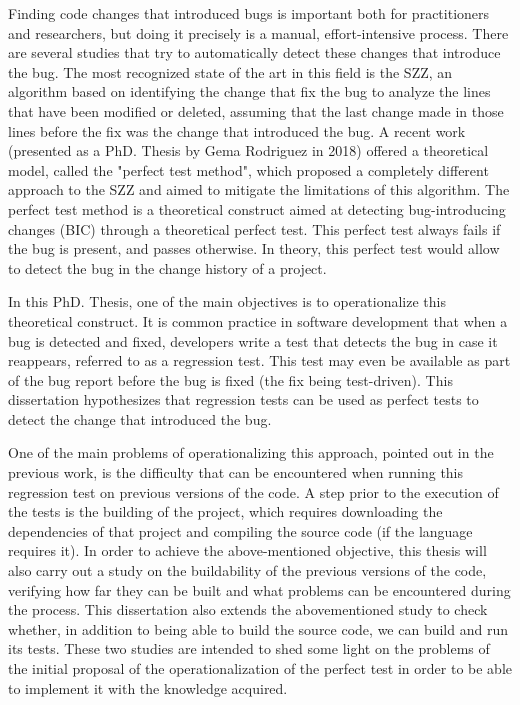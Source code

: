 Finding code changes that introduced bugs is important both for practitioners and researchers, but doing it precisely is a manual, effort-intensive process.
There are several studies that try to automatically detect these changes that introduce the bug. 
The most recognized state of the art in this field is the SZZ, an algorithm based on identifying the change that fix the bug to analyze the lines that have been modified or deleted, assuming that the last change made in those lines before the fix was the change that introduced the bug. 
A recent work (presented as a PhD. Thesis by Gema Rodriguez in 2018) offered a theoretical model, called the "perfect test method", which proposed a completely different approach to the SZZ and aimed to mitigate the limitations of this algorithm. 
The perfect test method is a theoretical construct aimed at detecting bug-introducing changes (BIC) through a theoretical perfect test. This perfect test always fails if the bug is present, and passes otherwise.
In theory, this perfect test would allow to detect the bug in the change history of a project.

In this PhD. Thesis, one of the main objectives is to operationalize this theoretical construct.
It is common practice in software development that when a bug is detected and fixed, developers write a test that detects the bug in case it reappears, referred to as a regression test. 
This test may even be available as part of the bug report before the bug is fixed (the fix being test-driven). 
This dissertation hypothesizes that regression tests can be used as perfect tests to detect the change that introduced the bug. 

One of the main problems of operationalizing this approach, pointed out in the previous work, is the difficulty that can be encountered when running this regression test on previous versions of the code. 
A step prior to the execution of the tests is the building of the project, which requires downloading the dependencies of that project and compiling the source code (if the language requires it). 
In order to achieve the above-mentioned objective, this thesis will also carry out a study on the buildability of the previous versions of the code, verifying how far they can be built and what problems can be encountered during the process.
This dissertation also extends the abovementioned study to check whether, in addition to being able to build the source code, we can build and run its tests. 
These two studies are intended to shed some light on the problems of the initial proposal of the operationalization of the perfect test in order to be able to implement it with the knowledge acquired.

